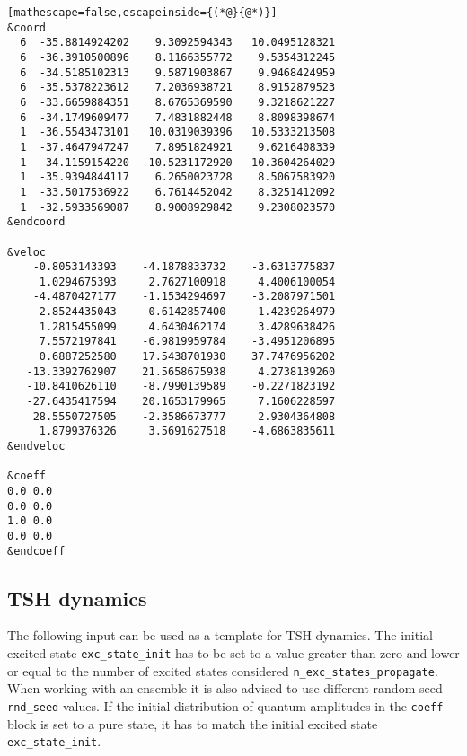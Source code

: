 \begin{lstlisting}[mathescape=false,escapeinside={(*@}{@*)}]
&coord
  6  -35.8814924202    9.3092594343   10.0495128321
  6  -36.3910500896    8.1166355772    9.5354312245
  6  -34.5185102313    9.5871903867    9.9468424959
  6  -35.5378223612    7.2036938721    8.9152879523
  6  -33.6659884351    8.6765369590    9.3218621227
  6  -34.1749609477    7.4831882448    8.8098398674
  1  -36.5543473101   10.0319039396   10.5333213508
  1  -37.4647947247    7.8951824921    9.6216408339
  1  -34.1159154220   10.5231172920   10.3604264029
  1  -35.9394844117    6.2650023728    8.5067583920
  1  -33.5017536922    6.7614452042    8.3251412092
  1  -32.5933569087    8.9008929842    9.2308023570
&endcoord

&veloc
    -0.8053143393    -4.1878833732    -3.6313775837
     1.0294675393     2.7627100918     4.4006100054
    -4.4870427177    -1.1534294697    -3.2087971501
    -2.8524435043     0.6142857400    -1.4239264979
     1.2815455099     4.6430462174     3.4289638426
     7.5572197841    -6.9819959784    -3.4951206895
     0.6887252580    17.5438701930    37.7476956202
   -13.3392762907    21.5658675938     4.2738139260
   -10.8410626110    -8.7990139589    -0.2271823192
   -27.6435417594    20.1653179965     7.1606228597
    28.5550727505    -2.3586673777     2.9304364808
     1.8799376326     3.5691627518    -4.6863835611
&endveloc

&coeff
0.0 0.0
0.0 0.0
1.0 0.0
0.0 0.0
&endcoeff
\end{lstlisting}

\subsection{TSH dynamics}

The following input can be used as a template for TSH dynamics. The initial excited state \verb+exc_state_init+ has to be set to a value greater than zero and lower or equal to the number of excited states considered \verb+n_exc_states_propagate+. When working with an ensemble it is also advised to use different random seed \verb+rnd_seed+ values. If the initial distribution of quantum amplitudes in the \verb+coeff+ block is set to a pure state, it has to match the initial excited state \verb+exc_state_init+.

